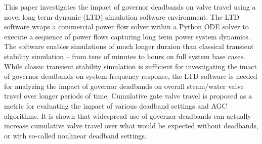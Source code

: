This paper investigates the impact of governor deadbands on valve travel using a novel long term dynamic (LTD) simulation software environment. The LTD software wraps a commercial power flow solver within a Python ODE solver to execute a sequence of power flows capturing long term power system dynamics. The software enables simulations of much longer duraion than classical transient stability simulation  -- from tens of minutes to hours on full system base cases. While classic transient stability simulation is sufficient for investigating the imact of governor deadbands on system frequency response, the LTD software is needed for analyzing the impact of governor deadbands on overall steam/water valve travel over longer periods of time. Cumulative gate valve travel is proposed as a metric for evaluating the impact of various deadband settings and AGC algorithms. It is shown that widespread use of governor deadbands can actually increase cumulative valve travel over what would be expected without deadbands, or with so-called nonlinear deadband settings.
